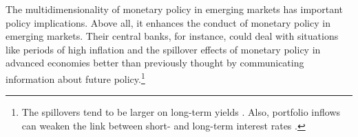 {The multidimensionality of monetary policy in emerging markets has important policy implications. 
Above all, it enhances the conduct of monetary policy in emerging markets. 
Their central banks, for instance, could deal with situations like periods of high inflation and the spillover effects of monetary policy in advanced economies better than previously thought by communicating information about future policy.\footnote{The spillovers tend to be larger on long-term yields \parencite{Obstfeld:2015,KearnsSchrimpfXia:2022}. Also, portfolio inflows can weaken the link between short- and long-term interest rates \parencite{ItoTran:2022}.} 

}
